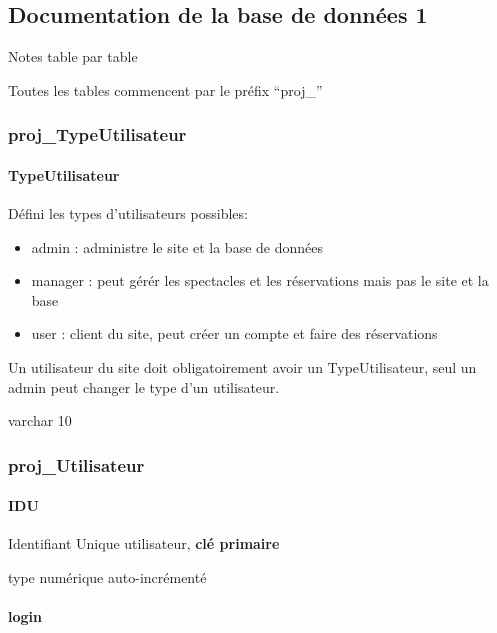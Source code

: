 \subsection{Documentation de la base de données
1}\label{documentation-de-la-base-de-donnuxe9es-1}

Notes table par table

Toutes les tables commencent par le préfix ``proj\_''

\subsubsection{proj\_TypeUtilisateur}\label{projux5ftypeutilisateur}

\paragraph{\texorpdfstring{\textbf{TypeUtilisateur}}{TypeUtilisateur}}\label{typeutilisateur}

Défini les types d'utilisateurs possibles:

\begin{itemize}
\tightlist
\item
  admin : administre le site et la base de données
\item
  manager : peut gérér les spectacles et les réservations mais pas le
  site et la base
\item
  user : client du site, peut créer un compte et faire des réservations
\end{itemize}

Un utilisateur du site doit obligatoirement avoir un TypeUtilisateur,
seul un admin peut changer le type d'un utilisateur.

varchar 10

\subsubsection{proj\_Utilisateur}\label{projux5futilisateur}

\paragraph{\texorpdfstring{\textbf{IDU}}{IDU}}\label{idu}

Identifiant Unique utilisateur, \textbf{clé primaire}

type numérique auto-incrémenté

\paragraph{login}\label{login}

